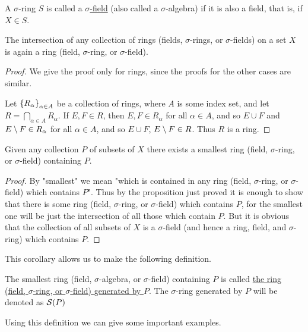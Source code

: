 \begin{definition}
A $\sigma$-ring $S$ is called a \underline{$\sigma$-field} (also called a $\sigma$-algebra) if it is also a field, that is, if $X\in S$.
\end{definition}

\begin{proposition}
The intersection of any collection of rings (fields, $\sigma$-rings, or $\sigma$-fields) on a set $X$ is again a ring (field, $\sigma$-ring, or $\sigma$-field).
\end{proposition}
\begin{proof}
We give the proof only for rings, since the proofs for the other cases are similar.

Let $\left\{R_\alpha\right\}_{\alpha\in A}$ be a collection of rings, where $A$ is some index set, and let $R =\bigcap_{\alpha\in A}R_\alpha$. If $E,F\in R$, then $E,F\in R_\alpha$ for all $\alpha\in A$, and so $E\cup F$ and $E\setminus F\in R_\alpha$ for all $\alpha\in A$, and so $E\cup F$, $E\setminus F\in R$. Thus $R$ is a ring.
\end{proof}

\begin{corollary}
Given any collection $P$ of subsets of $X$ there exists a smallest ring (field, $\sigma$-ring, or $\sigma$-field) containing $P$.
\end{corollary}
\begin{proof}
By "smallest" we mean "which is contained in any ring (field, $\sigma$-ring, or $\sigma$-field) which contains $P$". Thus by the proposition just proved it is enough to show that there is some ring (field, $\sigma$-ring, or $\sigma$-field) which contains $P$, for the smallest one will be just the intersection of all those which contain $P$. But it is obvious that the collection of all subsets of $X$ is a $\sigma$-field (and hence a ring, field, and $\sigma$-ring) which contains $P$.
\end{proof}

This corollary allows us to make the following definition.

\begin{definition}
\label{def:generate sets}
The smallest ring (field, $\sigma$-algebra, or $\sigma$-field) containing $P$ is called \underline{the ring (field, $\sigma$-ring, or $\sigma$-field) generated by $P$}. The $\sigma$-ring generated by $P$ will be denoted as ${\cal S}(P)$
\end{definition}

Using this definition we can give some important examples.


